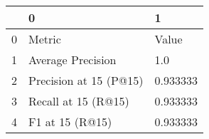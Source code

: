 \begin{tabular}{lll}
\toprule
{} &                       0 &         1 \\
\midrule
0 &                  Metric &     Value \\
1 &       Average Precision &       1.0 \\
2 &  Precision at 15 (P@15) &  0.933333 \\
3 &     Recall at 15 (R@15) &  0.933333 \\
4 &         F1 at 15 (R@15) &  0.933333 \\
\bottomrule
\end{tabular}
